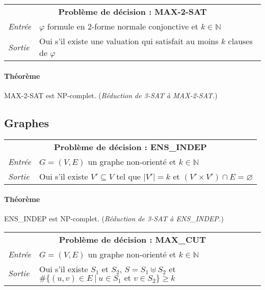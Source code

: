 \documentclass[french]{article}
\newcommand{\size}[1]{\vert #1 \vert}
\begin{document}
\vspace{0.5cm}
\begin{tabularx}{\textwidth}{p{1cm}X}
\multicolumn{2}{c}{\textbf{Problème de décision : MAX-2-SAT}} \\ 
\emph{Entrée} & $\varphi$ formule en 2-forme normale conjonctive et $k \in \mathbb{N}$ \\ 
\emph{Sortie} & Oui s'il existe une valuation qui satisfait au moins $k$ clauses de $\varphi$ \\
\end{tabularx}

\paragraph{Théorème} MAX-2-SAT est NP-complet. (\emph{Réduction de 3-SAT à MAX-2-SAT.})

\subsection{Graphes}

\vspace{0.5cm}
\begin{tabularx}{\textwidth}{p{1cm}X}
\multicolumn{2}{c}{\textbf{Problème de décision : ENS\_INDEP}} \\ 
\emph{Entrée} & $G = (V, E)$ un graphe non-orienté et $k \in \mathbb{N}$ \\ 
\emph{Sortie} & Oui s'il existe $V' \subseteq V$ tel que $\size{V'} = k$ et $(V' \times V') \cap E = \varnothing$ \\
\end{tabularx}

\paragraph{Théorème} ENS\_INDEP est NP-complet. (\emph{Réduction de 3-SAT à ENS\_INDEP.})


\vspace{0.5cm}
\begin{tabularx}{\textwidth}{p{1cm}X}
\multicolumn{2}{c}{\textbf{Problème de décision : MAX\_CUT}} \\ 
\emph{Entrée} & $G = (V, E)$ un graphe non-orienté et $k \in \mathbb{N}$ \\ 
\emph{Sortie} & Oui s'il existe $S_1$ et $S_2$, $S = S_1 \uplus S_2$ et $\# \lbrace (u,v) \in E ~\vert~ u \in S_1 \text{ et } v \in S_2 \rbrace \geq k$ \\
\end{tabularx}
\end{document}

